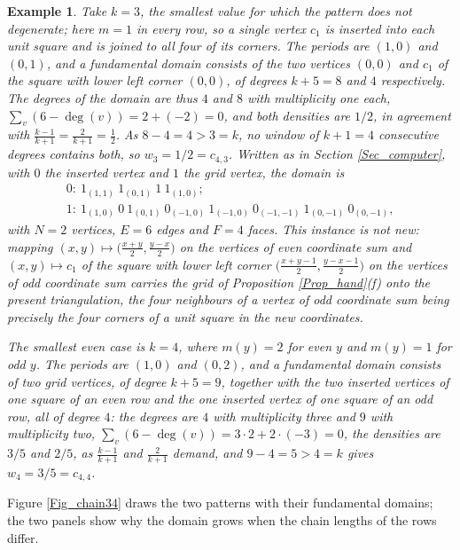 \documentclass[10pt,a4paper]{article}
\newtheorem{example}[theorem]{Example}
\begin{document}
\begin{example}
\label{Ex_chain3}Take $k=3$, the smallest value for which the pattern does not degenerate; here $m=1$
in every row, so a single vertex $c_{1}$ is inserted into each unit square and is joined to all four
of its corners. The periods are $(1,0)$ and $(0,1)$, and a fundamental domain consists of the two
vertices $(0,0)$ and $c_{1}$ of the square with lower left corner $(0,0)$, of degrees $k+5=8$ and $4$
respectively. The degrees of the domain are thus $4$ and $8$ with multiplicity one each,
$\sum_{v}(6-\deg (v))=2+(-2)=0$, and both densities are $1/2$, in agreement with
$\frac{k-1}{k+1}=\frac{2}{k+1}=\frac{1}{2}$. As $8-4=4>3=k$, no window of $k+1=4$ consecutive degrees
contains both, so $w_{3}=1/2=c_{4,3}$. Written as in Section \ref{Sec_computer}, with $0$ the
inserted vertex and $1$ the grid vertex, the domain is
\[
\begin{array}{l}
0:\ 1_{(1,1)}\ 1_{(0,1)}\ 1\ 1_{(1,0)};\\
1:\ 1_{(1,0)}\ 0\ 1_{(0,1)}\ 0_{(-1,0)}\ 1_{(-1,0)}\ 0_{(-1,-1)}\ 1_{(0,-1)}\ 0_{(0,-1)},
\end{array}
\]
with $N=2$ vertices, $E=6$ edges and $F=4$ faces. This instance is not new: mapping
$(x,y)\mapsto \bigl( \tfrac{x+y}{2},\tfrac{y-x}{2}\bigr) $ on the vertices of even coordinate sum and
$(x,y)\mapsto c_{1}$ of the square with lower left corner
$\bigl( \tfrac{x+y-1}{2},\tfrac{y-x-1}{2}\bigr) $ on the vertices of odd coordinate sum carries the
grid of Proposition \ref{Prop_hand}(f) onto the present triangulation, the four neighbours of a
vertex of odd coordinate sum being precisely the four corners of a unit square in the new coordinates.

The smallest even case is $k=4$, where $m(y)=2$ for even $y$ and $m(y)=1$ for odd $y$. The periods
are $(1,0)$ and $(0,2)$, and a fundamental domain consists of two grid vertices, of degree
$k+5=9$, together with the two inserted vertices of one square of an even row and the one inserted
vertex of one square of an odd row, all of degree $4$: the degrees are $4$ with multiplicity three and
$9$ with multiplicity two, $\sum_{v}(6-\deg (v))=3\cdot 2+2\cdot (-3)=0$, the densities are $3/5$ and
$2/5$, as $\frac{k-1}{k+1}$ and $\frac{2}{k+1}$ demand, and $9-4=5>4=k$ gives $w_{4}=3/5=c_{4,4}$.
\end{example}

Figure \ref{Fig_chain34} draws the two patterns with their fundamental domains; the
two panels show why the domain grows when the chain lengths of the rows differ.
\end{document}
